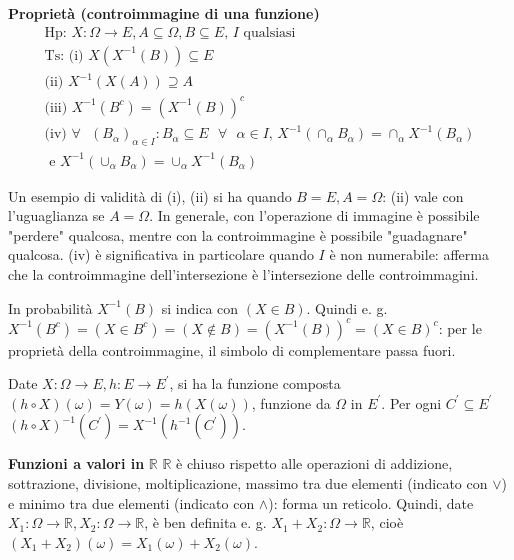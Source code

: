 \documentclass{article}
\begin{document}
\textbf{Propriet\`{a} (controimmagine di una funzione)}%
\begin{gather*}
\text{Hp: }X:\Omega \rightarrow E,A\subseteq \Omega ,B\subseteq E\text{, }I%
\text{ qualsiasi} \\
\text{Ts: (i) }X\left( X^{-1}\left( B\right) \right) \subseteq E \\
\text{(ii) }X^{-1}\left( X\left( A\right) \right) \supseteq A \\
\text{(iii) }X^{-1}\left( B^{c}\right) =\left( X^{-1}\left( B\right) \right)
^{c} \\
\text{(iv) }\forall \text{ }\left( B_{\alpha }\right) _{\alpha \in
I}:B_{\alpha }\subseteq E\text{ }\forall \text{ }\alpha \in I\text{, }%
X^{-1}\left( \cap _{\alpha }B_{\alpha }\right) =\cap _{\alpha }X^{-1}\left(
B_{\alpha }\right) \\
\text{ e }X^{-1}\left( \cup _{\alpha }B_{\alpha }\right) =\cup _{\alpha
}X^{-1}\left( B_{\alpha }\right)
\end{gather*}

Un esempio di validit\`{a} di (i), (ii) si ha quando $B=E,A=\Omega $: (ii)
vale con l'uguaglianza se $A=\Omega $. In generale, con l'operazione di
immagine \`{e} possibile "perdere" qualcosa, mentre con la controimmagine 
\`{e} possibile "guadagnare" qualcosa. (iv) \`{e} significativa in
particolare quando $I$ \`{e} non numerabile: afferma che la controimmagine
dell'intersezione \`{e} l'intersezione delle controimmagini.

In probabilit\`{a} $X^{-1}\left( B\right) $ si indica con $\left( X\in
B\right) $. Quindi e. g. $X^{-1}\left( B^{c}\right) =\left( X\in
B^{c}\right) =\left( X\not\in B\right) =\left( X^{-1}\left( B\right) \right)
^{c}=\left( X\in B\right) ^{c}$: per le propriet\`{a} della controimmagine,
il simbolo di complementare passa fuori.


Date $X:\Omega \rightarrow E,h:E\rightarrow E^{\prime }$, si ha la funzione
composta $\left( h\circ X\right) \left( \omega \right) =Y\left( \omega
\right) =h\left( X\left( \omega \right) \right) $, funzione da $\Omega $ in $%
E^{\prime }$. Per ogni $C^{\prime }\subseteq E^{\prime }$ $\left( h\circ
X\right) ^{-1}\left( C^{\prime }\right) =X^{-1}\left( h^{-1}\left( C^{\prime
}\right) \right) $.

\textbf{Funzioni a valori in }$%
\mathbb{R}
$ $%
\mathbb{R}
$ \`{e} chiuso rispetto alle operazioni di addizione, sottrazione,
divisione, moltiplicazione, massimo tra due elementi (indicato con $\vee $)
e minimo tra due elementi (indicato con $\wedge $): forma un reticolo.
Quindi, date $X_{1}:\Omega \rightarrow 
\mathbb{R}
,X_{2}:\Omega \rightarrow 
\mathbb{R}
$, \`{e} ben definita e. g. $X_{1}+X_{2}:\Omega \rightarrow 
\mathbb{R}
$, cio\`{e} $\left( X_{1}+X_{2}\right) \left( \omega \right) =X_{1}\left(
\omega \right) +X_{2}\left( \omega \right) $.
\end{document}
